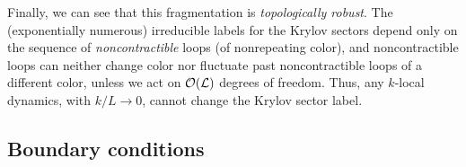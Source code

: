 Finally, we can see that this fragmentation is \emph{topologically robust}. The (exponentially numerous) irreducible labels for the Krylov sectors depend only on the sequence of \emph{noncontractible} loops (of nonrepeating color), and noncontractible loops can neither change color nor fluctuate past noncontractible loops of a different color, unless we act on $\cal{O}(L)$ degrees of freedom. Thus, any $k$-local dynamics, with $k/L \rightarrow 0$, cannot change the Krylov sector label. 


\subsection{Boundary conditions} \label{sub:boundary}

